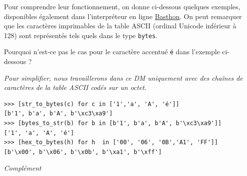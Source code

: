 \documentclass[a4paper, french, 12pt]{article}  %
\newcounter{rque}
\begin{document}
\begin{enumerate}
Pour comprendre leur fonctionnement, on donne ci-dessous quelques exemples, disponibles également dans l'interpréteur en ligne \href{https://frama.link/DM-Compression}{Basthon}. On peut remarquer que les caractères imprimables de la table ASCII (ordinal Unicode inférieur à 128) sont représentés tels quels dans le type \texttt{bytes}.

Pourquoi n'est-ce pas le cas pour le caractère accentué \texttt{é} dans l'exemple ci-dessous ?


{\itshape \bcattention{} Pour simplifier, nous travaillerons dans ce DM uniquement avec des chaînes de caractères de la table ASCII codés sur un octet. }

\begin{lstlisting}[style=compil]
>>> [str_to_bytes(c) for c in ['1','a', 'A', 'é']]
[b'1', b'a', b'A', b'\xc3\xa9']
>>> [bytes_to_str(b) for b in [b'1', b'a', b'A', b'\xc3\xa9']]
['1', 'a', 'A', 'é']
>>> [hex_to_bytes(h) for h  in ['00', '06', '0B','A1', 'FF']]
[b'\x00', b'\x06', b'\x0b', b'\xa1', b'\xff']
\end{lstlisting}

\end{enumerate}

\begin{center}
\hfill \hrulefill \textit{Complément} \hrulefill \hfill  \null
\end{center}
\end{document}
